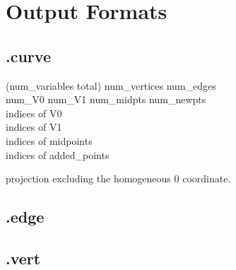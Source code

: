 \documentclass[10pt]{article}
\begin{document}
\clearpage

\appendix
\section{Output Formats}


\subsection{.curve}


(num\_variables total) num\_vertices num\_edges \\
num\_V0 num\_V1 num\_midpts num\_newpts \\

indices of V0  \\
indices of V1  \\
indices of midpoints \\
indices of added\_points

projection excluding the homogeneous 0 coordinate.\\


\subsection{.edge}


\subsection{.vert}




%
%	
%	
%	
\end{document}

